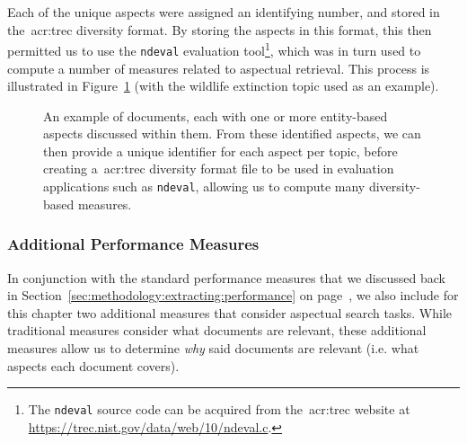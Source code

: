 Each of the unique aspects were assigned an identifying number, and stored in the~\gls{acr:trec} diversity format. By storing the aspects in this format, this then permitted us to use the \texttt{ndeval} evaluation tool\footnote{The \texttt{ndeval} source code can be acquired from the~\gls{acr:trec} website at \url{https://trec.nist.gov/data/web/10/ndeval.c}. }, which was in turn used to compute a number of measures related to aspectual retrieval. This process is illustrated in Figure~\ref{fig:entity_ids} (with the wildlife extinction topic used as an example).

\begin{figure}[t!]
    \centering
    \caption[Entity-based aspects example]{An example of documents, each with one or more entity-based aspects discussed within them. From these identified aspects, we can then provide a unique identifier for each aspect per topic, before creating a~\gls{acr:trec} diversity format file to be used in evaluation applications such as \texttt{ndeval}, allowing us to compute many diversity-based measures.}
    \label{fig:entity_ids}
\end{figure}

\subsubsection{Additional Performance Measures}\label{sec:diversity:users:measures}
In conjunction with the standard performance measures that we discussed back in Section~\ref{sec:methodology:extracting:performance} on page~\pageref{sec:methodology:extracting:performance}, we also include for this chapter two additional measures that consider aspectual search tasks. While traditional measures consider what documents are relevant, these additional measures allow us to determine \emph{why} said documents are relevant (i.e. what aspects each document covers).

